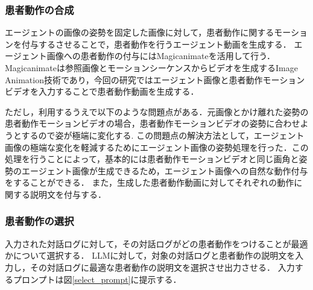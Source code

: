 \subsubsection{患者動作の合成}\label{generate_motion}
エージェントの画像の姿勢を固定した画像に対して，患者動作に関するモーションを付与するさせることで，患者動作を行うエージェント動画を生成する． エージェント画像への患者動作の付与にはMagicanimateを活用して行う． 
Magicanimateは参照画像とモーションシーケンスからビデオを生成するImage Animation技術であり，今回の研究ではエージェント画像と患者動作モーションビデオを入力することで患者動作動画を生成する． 
\par
ただし，利用するうえで以下のような問題点がある．元画像とかけ離れた姿勢の患者動作モーションビデオの場合，患者動作モーションビデオの姿勢に合わせようとするので姿が極端に変化する. この問題点の解決方法として，エージェント画像の極端な変化を軽減するためにエージェント画像の姿勢処理を行った．この処理を行うことによって，基本的には患者動作モーションビデオと同じ画角と姿勢のエージェント画像が生成できるため，エージェント画像への自然な動作付与をすることができる． また，生成した患者動作動画に対してそれぞれの動作に関する説明文を付与する．

\subsubsection{患者動作の選択}\label{select_motion}
入力された対話ログに対して，その対話ログがどの患者動作をつけることが最適かについて選択する． LLMに対して，対象の対話ログと患者動作の説明文を入力し，その対話ログに最適な患者動作の説明文を選択させ出力させる．
入力するプロンプトは図\ref{select_prompt}に提示する．
